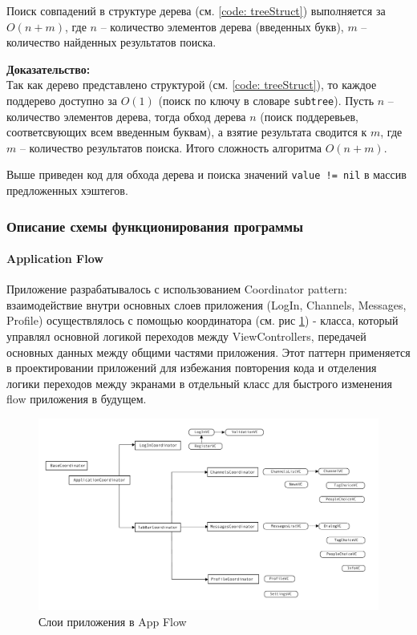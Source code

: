 \documentclass[a4paper,12pt]{article}
\begin{document}
		 
		 Поиск совпадений в структуре дерева (см. \ref{code: treeStruct}) выполняется за $O(n + m)$, где $n$ -- количество элементов дерева (введенных букв), $m$ -- количество найденных результатов поиска. 
		 
		 \textbf{Доказательство:\\}
		 Так как дерево представлено структурой (см. \ref{code: treeStruct}), то каждое поддерево доступно за $O(1)$ (поиск по ключу в словаре \verb|subtree|). Пусть $n$ -- количество элементов дерева, тогда обход дерева $n$ (поиск поддеревьев, соответсвующих всем введенным буквам), а взятие результата сводится к $m$, где $m$ -- количество результатов поиска. Итого сложность алгоритма $O(n + m)$.
		 
		 
		 Выше приведен код для обхода дерева и поиска значений \verb|value != nil| в массив предложенных хэштегов.
	\clearpage
	\subsubsection{Описание схемы функционирования программы}
	
	\paragraph{Application Flow\\}
	Приложение разрабатывалось с использованием Coordinator pattern: взаимодействие внутри основных слоев приложения (LogIn, Channels, Messages, Profile) осуществлялось с помощью координатора (см. рис \ref{pic: Coordinator}) - класса, который управлял основной логикой переходов между ViewControllers, передачей основных данных между общими частями приложения. Этот паттерн применяется в проектировании приложений для избежания повторения кода и отделения логики переходов между экранами в отдельный класс для быстрого изменения flow приложения в будущем.
	\begin{figure}[h]
		\centering
		\includegraphics[width = \linewidth]{../includes/illustrations/Flow.pdf}
		\caption{Слои приложения в App Flow}
		\label{pic: Coordinator}
	\end{figure}
\end{document}
